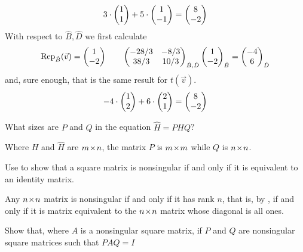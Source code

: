 \begin{exercises}
\begin{answer}
\begin{exparts}
\begin{equation*}
        3\cdot\colvec{1 \\ 1}+5\cdot\colvec{1 \\ -1}=\colvec{8 \\ -2}
      \end{equation*}
      With respect to $\hat{B},\hat{D}$ we first calculate
      \begin{equation*}
        \rep{\vec{v}}{\hat{B}}=\colvec{1 \\ -2}
        \qquad
        \begin{pmatrix}
          -28/3  &-8/3  \\
          38/3   &10/3
        \end{pmatrix}_{\hat{B},\hat{D}}
        \colvec{1 \\ -2}_{\hat{B}}
        =\colvec{-4 \\ 6}_{\hat{D}}
      \end{equation*}
      and, sure enough, that is the same result for $t(\vec{v})$.
      \begin{equation*}
        -4\cdot\colvec{1 \\ 2}+6\cdot\colvec{2 \\ 1}=\colvec{8 \\ -2}
      \end{equation*}
      \end{exparts} 
    \end{answer}
  \recommended \item 
    What sizes are \( P \) and \( Q \) in the equation $\hat{H}=PHQ$?
    \begin{answer}
      Where \( H \) and \( \hat{H} \) are \( \nbym{m}{n} \), the
      matrix \( P \) is \( \nbyn{m} \) while \( Q \) is \( \nbyn{n} \).  
    \end{answer}
  \recommended \item
    Use  to show that a square matrix
    is nonsingular if and only if it is equivalent to an identity matrix.
    \begin{answer}
        Any \( \nbyn{n} \) matrix is nonsingular if and only if it has 
        rank \( n \), that is, by  ,
        if and only if it is matrix equivalent to 
        the $\nbyn{n}$ matrix whose diagonal is all ones.  
    \end{answer}
  \recommended \item
    Show that, where \( A \) is a nonsingular square matrix, if
    \( P \) and \( Q \) are nonsingular square matrices such that \( PAQ=I \)

\end{exercises}
